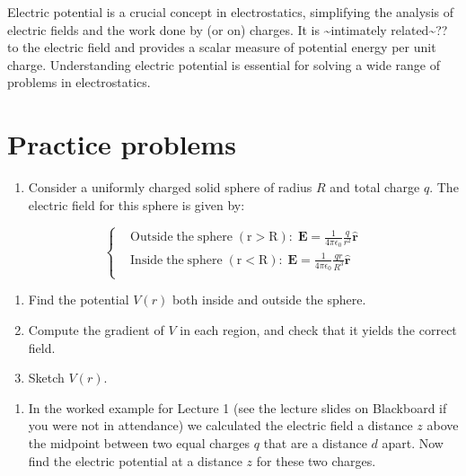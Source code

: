 \documentclass[
  letterpaper,
  DIV=11,
  numbers=noendperiod]{scrreprt}
\providecommand{\tightlist}{%
  \setlength{\itemsep}{0pt}\setlength{\parskip}{0pt}}\usepackage{longtable,booktabs,array}
\begin{document}
Electric potential is a crucial concept in electrostatics, simplifying
the analysis of electric fields and the work done by (or on) charges. It
is \textasciitilde intimately related\textasciitilde?? to the electric
field and provides a scalar measure of potential energy per unit charge.
Understanding electric potential is essential for solving a wide range
of problems in electrostatics.

\section{Practice problems}\label{practice-problems-1}

\begin{enumerate}
\def\labelenumi{\arabic{enumi})}
\tightlist
\item
  Consider a uniformly charged solid sphere of radius \(R\) and total
  charge \(q\). The electric field for this sphere is given by:
\end{enumerate}

\[
\left\{
    \begin{aligned}
         & \mathrm{Outside \; the \; sphere \; (r > R):} \; \mathrm{\mathbf{E}}= \frac{1}{4\pi\epsilon_0} \frac{q}{r^2} \hat{\mathrm{\mathbf{r}}}  \\
         & \mathrm{Inside \; the \; sphere \; (r < R):} \; \mathrm{\mathbf{E}}= \frac{1}{4\pi\epsilon_0} \frac{qr}{R^3} \hat{\mathrm{\mathbf{r}}} \\
    \end{aligned}
\right.
\]

\begin{enumerate}
\def\labelenumi{(\alph{enumi})}
\tightlist
\item
  Find the potential \(V(r)\) both inside and outside the sphere.
\item
  Compute the gradient of \(V\) in each region, and check that it yields
  the correct field.
\item
  Sketch \(V(r)\).
\end{enumerate}

\begin{enumerate}
\def\labelenumi{\arabic{enumi})}
\setcounter{enumi}{1}
\tightlist
\item
  In the worked example for Lecture 1 (see the lecture slides on
  Blackboard if you were not in attendance) we calculated the electric
  field a distance \(z\) above the midpoint between two equal charges
  \(q\) that are a distance \(d\) apart. Now find the electric potential
  at a distance \(z\) for these two charges.
\end{enumerate}
\end{document}
